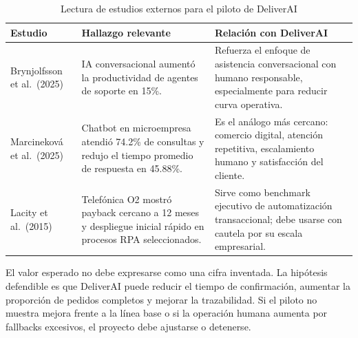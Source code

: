 \begin{table}[htbp]
\centering
\caption{Lectura de estudios externos para el piloto de \mbox{DeliverAI}}%
\label{tab:evidencia_externa}
\small
\begin{tabular}{@{}>{\raggedright\arraybackslash}p{3.4cm}>{\raggedright\arraybackslash}p{5.3cm}>{\raggedright\arraybackslash}p{5.5cm}@{}}
\toprule
\textbf{Estudio} & \textbf{Hallazgo relevante} & \textbf{Relación con DeliverAI} \\ \midrule
Brynjolfsson et al.\ (2025) & IA conversacional aumentó la productividad de agentes de soporte en 15\%. & Refuerza el enfoque de asistencia conversacional con humano responsable, especialmente para reducir curva operativa. \\
Marcineková et al.\ (2025) & Chatbot en microempresa atendió 74.2\% de consultas y redujo el tiempo promedio de respuesta en 45.88\%. & Es el análogo más cercano: comercio digital, atención repetitiva, escalamiento humano y satisfacción del cliente. \\
Lacity et al.\ (2015) & Telefónica O2 mostró payback cercano a 12 meses y despliegue inicial rápido en procesos RPA seleccionados. & Sirve como benchmark ejecutivo de automatización transaccional; debe usarse con cautela por su escala empresarial. \\ \bottomrule
\end{tabular}
\end{table}

El valor esperado no debe expresarse como una cifra inventada. La hipótesis defendible es que DeliverAI puede reducir el tiempo de confirmación, aumentar la proporción de pedidos completos y mejorar la trazabilidad. Si el piloto no muestra mejora frente a la línea base o si la operación humana aumenta por fallbacks excesivos, el proyecto debe ajustarse o detenerse.
